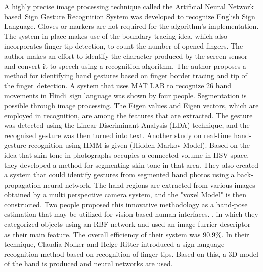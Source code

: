 \documentclass[fleqn, 11pt, twoside]{IOEGC}
\begin{document}
A highly precise image processing technique called the Artificial Neural Network based Sign Gesture Recognition System was developed to recognize English Sign Language. Gloves or markers are not required for the algorithm's implementation. The system in place makes use of the boundary tracing idea, which also incorporates finger-tip detection, to count the number of opened fingers. The author makes an effort to identify the character produced by the screen sensor and convert it to speech using a recognition algorithm. The author proposes a method for identifying hand gestures based on finger border tracing and tip of the finger detection. \cite{parul2014}
A system that uses MAT LAB to recognize 26 hand movements in Hindi sign language was shown by four people. Segmentation is possible through image processing. The Eigen values and Eigen vectors, which are employed in recognition, are among the features that are extracted. The gesture was detected using the Linear Discriminant Analysis (LDA) technique, and the recognized gesture was then turned into text. \cite{suriya2016}
Another study on real-time hand-gesture recognition using HMM is given (Hidden Markov Model). Based on the idea that skin tone in photographs occupies a connected volume in HSV space, they developed a method for segmenting skin tone in that area. They also created a system that could identify gestures from segmented hand photos using a back-propagation neural network.\cite{hyu1996}
The hand regions are extracted from various images obtained by a multi perspective camera system, and the "voxel Model" is then constructed. Two people proposed this innovative methodology as a hand-pose estimation that may be utilized for vision-based human interfaces. \cite{ueda2003}, in which they categorized objects using an RBF network and used an image furrier descriptor as their main feature. The overall efficiency of their system was 90.9\%. In their technique, Claudia Nolker and Helge Ritter introduced a sign language recognition method based on recognition of finger tips. Based on this, a 3D model of the hand is produced and neural networks are used.


\end{document}
